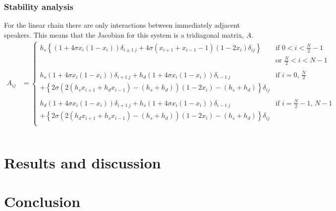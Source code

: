 \documentclass[12pt]{article}
\begin{document}
\subsubsection{Stability analysis}
For the linear chain there are only interactions between immediately adjacent speakers. This means that the Jacobian for this system is a tridiagonal matrix, $A$. 
\begin{align*}
A_{ij} &=
\begin{cases}
 h_s\left\lbrace  \left(1 + 4\sigma x_i \left( 1 - x_i \right) \right)\delta_{i \pm 1 \ j} + 4 \sigma \left( x_{i+1} + x_{i-1} -1 \right) \left( 1 - 2 x_i \right)  \delta_{ij}\right\rbrace  & \text{if $0<i<\frac{N}{2}-1$} \\
\quad & \text{or $\frac{N}{2}<i<N-1$} \\
%
\quad & \quad \\
%
h_s \left(1 + 4\sigma x_i \left( 1 - x_i \right) \right) \delta_{i+1 \ j} +  h_d \left(1 + 4\sigma x_i \left( 1 - x_i \right) \right) \delta_{i-1 \ j} & \text{if $i = 0$, $\frac{N}{2}$}\\
+ \left\lbrace 2 \sigma \left(  2 \left( h_s x_{i+1} + h_d x_{i-1} \right) - \left( h_s+h_d \right) \right) \left(1-2x_i\right) - \left( h_s+h_d \right) \right\rbrace \delta_{i j} & \quad \\
%
\quad & \quad \\
%
h_d \left(1 + 4\sigma x_i \left( 1 - x_i \right) \right) \delta_{i+1 \ j} +  h_s \left(1 + 4\sigma x_i \left( 1 - x_i \right) \right) \delta_{i-1 \ j}  &  \text{if $i = \frac{N}{2}-1$, $N-1$} \\
+ \left\lbrace 2 \sigma \left(  2 \left( h_d x_{i+1} + h_s x_{i-1} \right) - \left( h_s + h_d \right) \right) \left(1-2x_i\right) - \left( h_s+h_d \right) \right\rbrace \delta_{i j} & \quad \\
\end{cases}
\\\quad
\\
\end{align*}


\newpage
\section{Results and discussion}


\newpage
\section{Conclusion}
\end{document}
